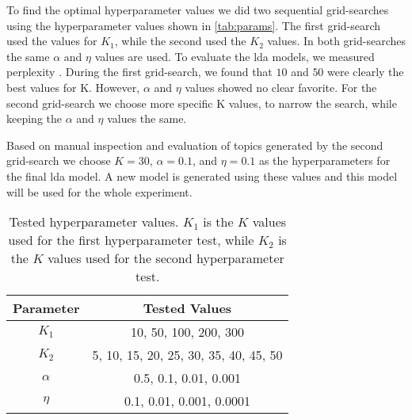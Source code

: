 To find the optimal hyperparameter values we did two sequential grid-searches using the hyperparameter values shown in \autoref{tab:params}.
The first grid-search used the values for $K_1$, while the second used the $K_2$ values.
In both grid-searches the same $\alpha$ and $\eta$ values are used.
To evaluate the \gls{lda} models, we measured perplexity .
During the first grid-search, we found that $10$ and $50$ were clearly the best values for K.
However, $\alpha$ and $\eta$ values showed no clear favorite.
For the second grid-search we choose more specific K values, to narrow the search, while keeping the $\alpha$ and $\eta$ values the same.

Based on manual inspection and evaluation of topics generated by the second grid-search we choose $K = 30$, $\alpha = 0.1$, and $\eta = 0.1$ as the hyperparameters for the final \gls{lda} model.
A new model is generated using these values and this model will be used for the whole experiment.

\begin{table}[h]
	\centering
	\begin{tabular}{c|c}
		Parameter & Tested Values\\
		\hline
		$K_1$ & 10, 50, 100, 200, 300\\
		$K_2$ & 5, 10, 15, 20, 25, 30, 35, 40, 45, 50\\
		$\alpha$ & 0.5, 0.1, 0.01, 0.001\\
		$\eta$ & 0.1, 0.01, 0.001, 0.0001\\
	\end{tabular}
	\caption{Tested hyperparameter values. $K_1$ is the $K$ values used for the first hyperparameter test, while $K_2$ is the $K$ values used for the second hyperparameter test.}
	\label{tab:params}
\end{table}
